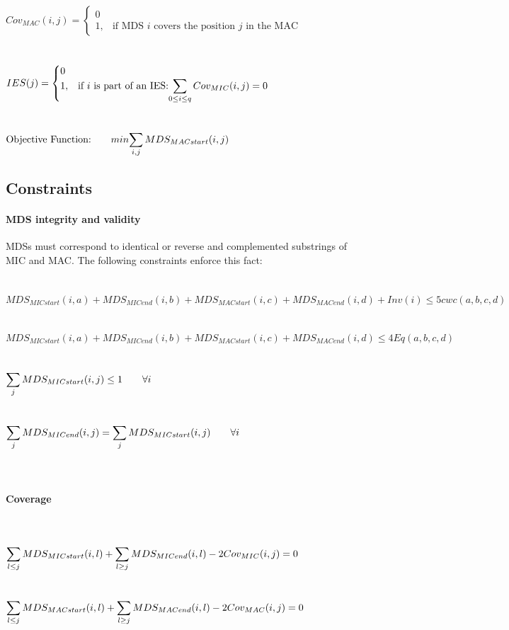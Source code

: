 $Cov_{MAC}(i,j) = \begin{cases} 0 \\ 1, & \mbox{if MDS } i\mbox{ covers the position } j \mbox{ in the MAC} \end{cases}$ \\\\\\
$IES(j) = \begin{cases} 0 \\ 1, & \mbox{if } i \mbox{ is part of an IES:} \mathlarger{\sum_{0 \leq i \leq q} Cov_{MIC}(i,j) = 0} \end{cases}$ \\\\\\

$\mbox{Objective Function:} \qquad min \mathlarger{\sum_{i,j} MDS_{MACstart}(i,j)}$

\subsection{Constraints}

\paragraph{MDS integrity and validity}MDSs must correspond to identical or reverse and complemented substrings of MIC and MAC. The following constraints enforce this fact:
\\\\\\
$MDS_{MICstart}(i,a) + MDS_{MICend}(i,b) + MDS_{MACstart}(i,c) + MDS_{MACend}(i,d) + Inv(i) \leq 5 cwc(a,b,c,d)$ \\\\\\
$MDS_{MICstart}(i,a) + MDS_{MICend}(i,b) + MDS_{MACstart}(i,c) + MDS_{MACend}(i,d) \leq 4 Eq(a,b,c,d)$ \\\\\\
$\mathlarger{\sum_{j} MDS_{MICstart}(i,j)\leq 1 \qquad \forall i}$ \\\\\\
$\mathlarger{\sum_{j} MDS_{MICend}(i,j) = \sum_{j} MDS_{MICstart}(i,j) \qquad \forall i}$ \\\\\\

\paragraph{Coverage} $ $
\\\\\\
$\mathlarger{\sum_{l\leq j} MDS_{MICstart}(i,l) + \sum_{l\geq j}MDS_{MICend}(i,l) - 2Cov_{MIC}(i,j) = 0}$ \\\\\\
$\mathlarger{\sum_{l\leq j} MDS_{MACstart}(i,l) + \sum_{l\geq j}MDS_{MACend}(i,l) - 2Cov_{MAC}(i,j) = 0}$ \\\\\\

